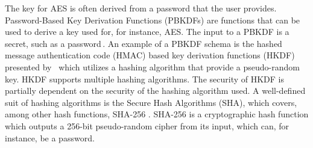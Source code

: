The key for AES is often derived from a password that the user provides. Password-Based Key Derivation Functions (PBKDFs) are functions that can be used to derive a key used for, for instance, AES. The input to a PBKDF is a secret, such as a password\,\cite{kodwaniSecurityKeyDerivation2021}. An example of a PBKDF schema is the hashed message authentication code (HMAC) based key derivation functions (HKDF) presented by \citeauthor{krawczykCryptographicExtractionKey2010}\,\cite{krawczykCryptographicExtractionKey2010}\cite{krawczykHMACbasedExtractandExpandKey2010} which utilizes a hashing algorithm that provide a pseudo-random key. HKDF supports multiple hashing algorithms. The security of HKDF is partially dependent on the security of the hashing algorithm used. A well-defined suit of hashing algorithms is the Secure Hash Algorithms (SHA), which covers, among other hash functions, SHA-256 \cite{hansenUSSecureHash2011}. SHA-256 is a cryptographic hash function which outputs a 256-bit pseudo-random cipher from its input, which can, for instance, be a password.